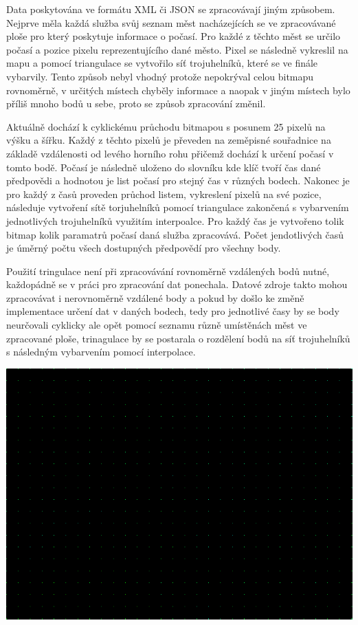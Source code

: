 \documentclass[czech,bachelor,dept460,male,csharp,cpdeclaration]{diploma}
\begin{document}
	Data poskytována ve formátu XML či JSON se zpracovávají jiným způsobem. Nejprve měla každá služba svůj seznam měst nacházejících se ve zpracovávané ploše pro který poskytuje informace o počasí. Pro každé z těchto měst se určilo počasí a 
	pozice pixelu reprezentujícího dané město. Pixel se následně vykreslil na mapu a pomocí triangulace se vytvořilo síť trojuhelníků, které se ve finále vybarvily. Tento způsob nebyl vhodný protože nepokrýval celou bitmapu rovnoměrně, v určitých místech chyběly informace a naopak v jiným místech bylo příliš mnoho bodů u sebe, proto se způsob zpracování změnil.
	
	Aktuálně dochází k cyklickému průchodu bitmapou s posunem 25 pixelů na výšku a šířku. Každý z těchto pixelů je převeden na zeměpisné souřadnice na základě vzdálenosti od levého horního rohu přičemž dochází k určení počasí v tomto bodě. Počasí je následně uloženo do slovníku kde klíč tvoří čas dané předpovědi a hodnotou je list počasí pro stejný čas v různých bodech. Nakonec je pro každý z časů proveden průchod listem, vykreslení pixelů na své pozice, následuje vytvoření sítě torjuhelníků pomocí triangulace zakončená s vybarvením jednotlivých trojuhelníků využitím interpoalce. Pro každý čas je vytvořeno tolik bitmap kolik paramatrů počasí daná služba zpracovává. Počet jendotlivých časů je úměrný počtu všech dostupných předpovědí pro všechny body.
	
	Použití tringulace není při zpracovávání rovnoměrně vzdálených bodů nutné, každopádně se v práci pro zpracování dat ponechala. Datové zdroje takto mohou zpracovávat i nerovnoměrně vzdálené body a pokud by došlo ke změně implementace určení dat v daných bodech, tedy pro jednotlivé časy by se body neurčovali cyklicky ale opět pomocí seznamu různě umístěnách měst ve zpracované ploše, trinagulace by se postarala o rozdělení bodů na síť trojuhelníků s následným vybarvením pomocí interpolace.
	
	\begin{center}
		\includegraphics[scale=0.5]{Data/bmp_body.png}
	\end{center}
	
\end{document}
